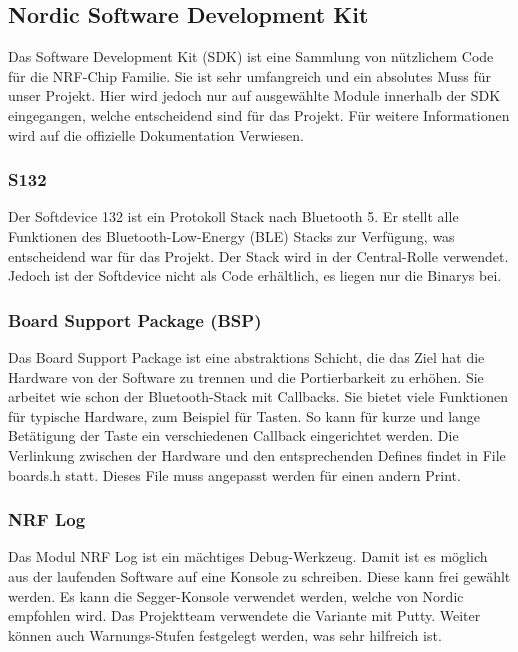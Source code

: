 \subsection{Nordic Software Development Kit}\label{sec:nordicsdk}

Das Software Development Kit (SDK) ist eine Sammlung von nützlichem Code für die NRF-Chip Familie. Sie ist sehr umfangreich und ein absolutes Muss für unser Projekt. Hier wird jedoch nur auf ausgewählte Module innerhalb der SDK eingegangen, welche entscheidend sind für das Projekt. Für weitere Informationen wird auf die offizielle Dokumentation \cite{nordic_info} Verwiesen.

\subsubsection*{S132}
Der Softdevice 132 ist ein Protokoll Stack nach Bluetooth 5. Er stellt alle Funktionen des Bluetooth-Low-Energy (BLE) Stacks zur Verfügung, was entscheidend war für das Projekt. Der Stack wird in der Central-Rolle verwendet. Jedoch ist der Softdevice nicht als Code erhältlich, es liegen nur die Binarys bei.

\subsubsection*{Board Support Package (BSP)}
Das Board Support Package ist eine abstraktions Schicht, die das Ziel hat die Hardware von der Software zu trennen und die Portierbarkeit zu erhöhen. Sie arbeitet wie schon der Bluetooth-Stack mit Callbacks. Sie bietet viele Funktionen für typische Hardware, zum Beispiel für Tasten. So kann für kurze und lange Betätigung der Taste ein verschiedenen Callback eingerichtet werden. Die Verlinkung zwischen der Hardware und den entsprechenden Defines findet in File  boards.h statt. Dieses File muss angepasst werden für einen andern Print.

\subsubsection*{NRF Log}
Das Modul NRF Log ist ein mächtiges Debug-Werkzeug. Damit ist es möglich aus der laufenden Software auf eine Konsole zu schreiben. Diese kann frei gewählt werden. Es kann die Segger-Konsole verwendet werden, welche von Nordic empfohlen wird. Das Projektteam verwendete die Variante mit Putty. Weiter können auch Warnungs-Stufen festgelegt werden, was sehr hilfreich ist.
